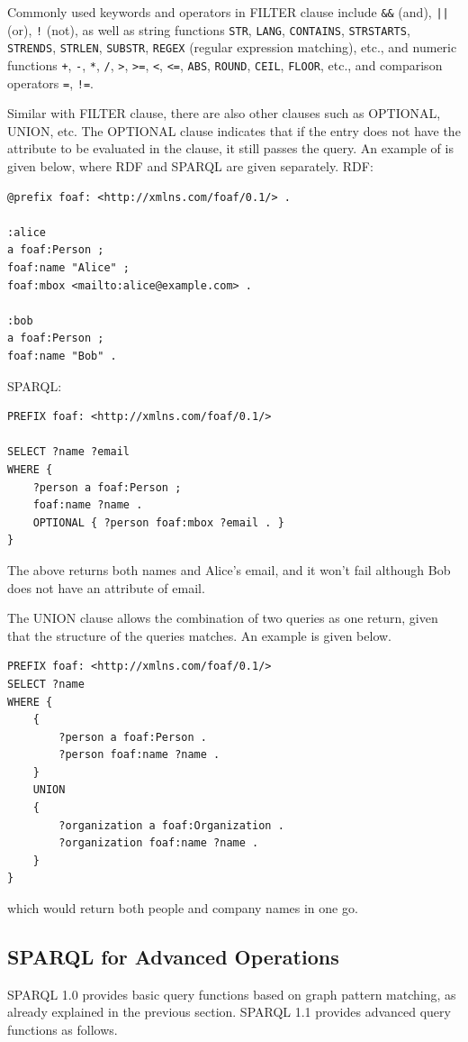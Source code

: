 Commonly used keywords and operators in FILTER clause include \verb|&&| (and), \verb$||$ (or), \verb|!| (not), as well as string functions \verb|STR|, \verb|LANG|, \verb|CONTAINS|, \verb|STRSTARTS|, \verb|STRENDS|, \verb|STRLEN|, \verb|SUBSTR|, \verb|REGEX| (regular expression matching), etc., and numeric functions \verb|+|, \verb|-|, \verb|*|, \verb|/|, \verb|>|, \verb|>=|, \verb|<|, \verb|<=|, \verb|ABS|, \verb|ROUND|, \verb|CEIL|, \verb|FLOOR|, etc., and comparison operators \verb|=|, \verb|!=|.

Similar with FILTER clause, there are also other clauses such as OPTIONAL, UNION, etc. The OPTIONAL clause indicates that if the entry does not have the attribute to be evaluated in the clause, it still passes the query. An example of is given below, where RDF and SPARQL are given separately. RDF:
\begin{lstlisting}
@prefix foaf: <http://xmlns.com/foaf/0.1/> .

:alice
a foaf:Person ;
foaf:name "Alice" ;
foaf:mbox <mailto:alice@example.com> .

:bob
a foaf:Person ;
foaf:name "Bob" .
\end{lstlisting}
SPARQL:
\begin{lstlisting}
PREFIX foaf: <http://xmlns.com/foaf/0.1/>

SELECT ?name ?email
WHERE {
	?person a foaf:Person ;
	foaf:name ?name .
	OPTIONAL { ?person foaf:mbox ?email . }
}
\end{lstlisting}
The above returns both names and Alice's email, and it won't fail although Bob does not have an attribute of email.

The UNION clause allows the combination of two queries as one return, given that the structure of the queries matches. An example is given below.
\begin{lstlisting}
PREFIX foaf: <http://xmlns.com/foaf/0.1/>
SELECT ?name 
WHERE {
	{
		?person a foaf:Person .
		?person foaf:name ?name .
	} 
	UNION 
	{
		?organization a foaf:Organization .
		?organization foaf:name ?name .
	}
}
\end{lstlisting}
which would return both people and company names in one go.

\subsection{SPARQL for Advanced Operations}

SPARQL 1.0 provides basic query functions based on graph pattern matching, as already explained in the previous section. SPARQL 1.1 provides advanced query functions as follows.

